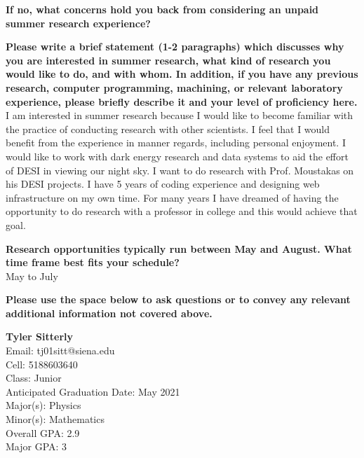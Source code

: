 \documentclass[12pt,preprint]{aastex}
\begin{document}
\vspace*{3mm}
{\bf If no, what concerns hold you back from considering an unpaid summer research experience?}\\
\vspace*{3mm}

\vspace*{3mm}
{\bf Please write a brief statement (1-2 paragraphs) which discusses why you are interested in summer research, what kind of research you would like to do, and with whom.  In addition, if you have any previous research, computer programming, machining, or relevant laboratory experience, please briefly describe it and your level of proficiency here.}\\
I am interested in summer research because I would like to become familiar with the practice of conducting research with other scientists. I feel that I would benefit from the experience in manner regards, including personal enjoyment. I would like to work with dark energy research and data systems to aid the effort of DESI in viewing our night sky. I want to do research with Prof. Moustakas on his DESI projects. I have 5 years of coding experience and designing web infrastructure on my own time. For many years I have dreamed of having the opportunity to do research with a professor in college and this would achieve that goal.

\vspace*{3mm}
{\bf Research opportunities typically run between May and August.  What time frame best fits your schedule?}\\
May to July

\vspace*{3mm}
{\bf Please use the space below to ask questions or to convey any relevant additional information not covered above.}\\
\vspace*{3mm}

\vspace*{3mm}
\clearpage
{\large {\bf Tyler Sitterly}}\\
Email: tj01sitt@siena.edu\\
Cell: 5188603640\\
Class: Junior\\
Anticipated Graduation Date: May 2021\\
Major(s): Physics\\
Minor(s): Mathematics\\
Overall GPA: 2.9\\
Major GPA: 3\\
\end{document}
